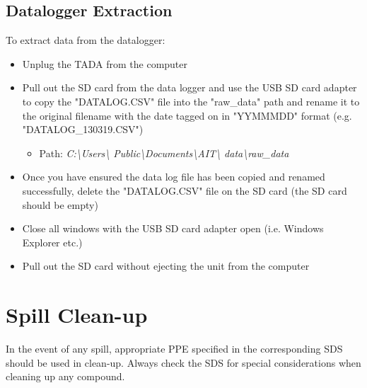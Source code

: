 \documentclass[letterpaper,11pt]{article}
\begin{document}
    
    
\subsection{Datalogger Extraction}
To extract data from the datalogger:
    \begin{itemize}
    \item Unplug the TADA from the computer
    \item Pull out the SD card from the data logger and use the USB SD card 
        adapter to copy the "DATALOG.CSV" file into the "raw\_data" path and 
        rename it to the original filename with the date 
        tagged on in "YYMMMDD" format (e.g. "DATALOG\_130319.CSV")
        \begin{itemize}
        \item Path: \textit{C:\textbackslash Users\textbackslash 
            Public\textbackslash Documents\textbackslash AIT\textbackslash 
            data\textbackslash raw\_data}
        \end{itemize}
    \item Once you have ensured the data log file has been copied and 
        renamed successfully, delete the "DATALOG.CSV" file on the SD card
        (the SD card should be empty)
    \item Close all windows with the USB SD card adapter open 
        (i.e. Windows Explorer etc.)
    \item Pull out the SD card without ejecting the unit from the computer
    \end{itemize}

    
\newpage
\section{Spill Clean-up} \label{sec:spills}
In the event of any spill, appropriate PPE specified in the corresponding SDS 
    should be used in clean-up. Always check the SDS for special considerations
    when cleaning up any compound.
\end{document}
